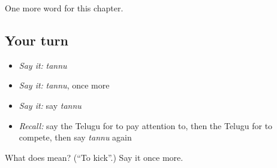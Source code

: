 \begin{grammarlens}[title={What you've built}]
One more word for this chapter.
\end{grammarlens}

\subsection*{Your turn}
\begin{itemize}
\raggedright
  \item \emph{Say it:} \emph{tannu}
  \item \emph{Say it:} \emph{tannu}, once more
  \item \emph{Say it:} say \emph{tannu}
  \item \emph{Recall:} say the Telugu for to pay attention to, then the Telugu for to compete, then say \emph{tannu} again
\end{itemize}

\begin{tcolorbox}[breakable,colback=teal!4,colframe=teal!35!black,title={Before you move on}]
What does  mean? (\textquotedblleft{}To kick\textquotedblright{}.) Say it once more.
\end{tcolorbox}
